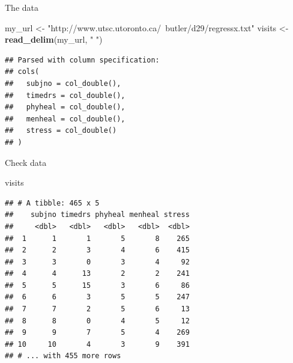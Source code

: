 \documentclass[
  ignorenonframetext,
]{beamer}
\newenvironment{Shaded}{\begin{snugshade}}{\end{snugshade}}
\newcommand{\KeywordTok}[1]{\textcolor[rgb]{0.13,0.29,0.53}{\textbf{#1}}}
\newcommand{\NormalTok}[1]{#1}
\newcommand{\StringTok}[1]{\textcolor[rgb]{0.31,0.60,0.02}{#1}}
\begin{document}
\begin{frame}[fragile]{The data}
\protect\hypertarget{the-data}{}

\begin{Shaded}
\begin{Highlighting}[]
\NormalTok{my_url <-}\StringTok{ }
\StringTok{  "http://www.utsc.utoronto.ca/~butler/d29/regressx.txt"}
\NormalTok{visits <-}\StringTok{ }\KeywordTok{read_delim}\NormalTok{(my_url, }\StringTok{" "}\NormalTok{)}
\end{Highlighting}
\end{Shaded}

\begin{verbatim}
## Parsed with column specification:
## cols(
##   subjno = col_double(),
##   timedrs = col_double(),
##   phyheal = col_double(),
##   menheal = col_double(),
##   stress = col_double()
## )
\end{verbatim}

\end{frame}

\begin{frame}[fragile]{Check data}
\protect\hypertarget{check-data-1}{}

\small

\begin{Shaded}
\begin{Highlighting}[]
\NormalTok{visits}
\end{Highlighting}
\end{Shaded}

\begin{verbatim}
## # A tibble: 465 x 5
##    subjno timedrs phyheal menheal stress
##     <dbl>   <dbl>   <dbl>   <dbl>  <dbl>
##  1      1       1       5       8    265
##  2      2       3       4       6    415
##  3      3       0       3       4     92
##  4      4      13       2       2    241
##  5      5      15       3       6     86
##  6      6       3       5       5    247
##  7      7       2       5       6     13
##  8      8       0       4       5     12
##  9      9       7       5       4    269
## 10     10       4       3       9    391
## # ... with 455 more rows
\end{verbatim}

\normalsize

\end{frame}
\end{document}
